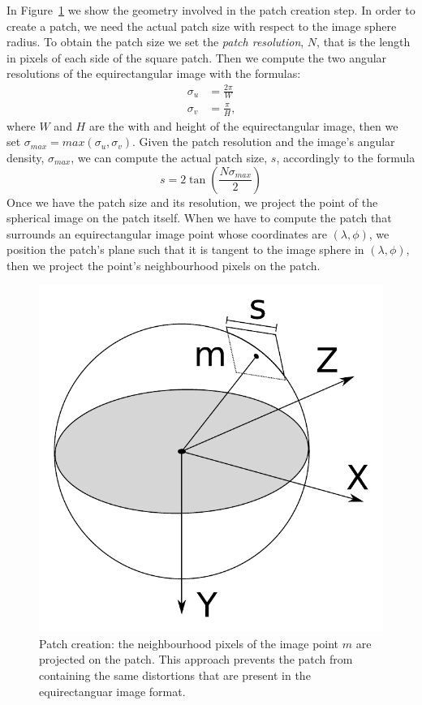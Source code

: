 In Figure~\ref{fig:patch} we show the geometry involved in the
patch creation step. In order to create a patch, we need the actual patch size
with respect to the image sphere radius. To obtain the patch size we set the
\emph{patch resolution}, $N$, that is the length in pixels of each side of the
square patch. Then we compute the two angular
resolutions of the equirectangular image with the formulas:
%
\begin{subequations}
	\label{eq:angular_resolution}
	\begin{align}
	\sigma_u &= \frac{2\pi}{W} \\
	\sigma_v &= \frac{\pi}{H}	\text{,}
	\end{align}
\end{subequations}
%
\noindent where $W$ and $H$ are the with and height of the equirectangular
image, then we set $\sigma_{max} = max(\sigma_u, \sigma_v)$.
Given the patch resolution and the image's angular density, $\sigma_{max}$, we can
compute the actual patch size, $s$, accordingly to the formula
%
\begin{equation*}
s = 2\tan\left(\frac{N\sigma_{max}}{2}\right)
\end{equation*}
%
Once we have the patch size and its resolution, we project the point of the
spherical image on the patch itself.
When we have to compute the patch that surrounds an equirectangular image point
whose coordinates are $(\lambda,\phi)$, we position the patch's plane such that
it is tangent to the image sphere in $(\lambda, \phi)$, then we project
the point's neighbourhood pixels on the patch.
%
\begin{figure}
\centering
\includegraphics[width=0.6\linewidth]{img/patch_creation.pdf}
\caption{Patch creation: the neighbourhood pixels of the image point $m$
are projected on the patch. This approach prevents the patch from containing
the same distortions that are present in the equirectanguar image format.}
	\label{fig:patch}
\end{figure}
%
